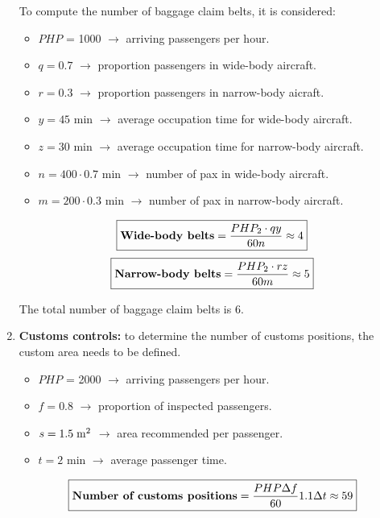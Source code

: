 \begin{enumerate}
To compute the number of baggage claim belts, it is considered:
\begin{itemize}
\item $PHP$ = 1000 $\rightarrow$ arriving passengers per hour.
\item $q=0.7$ $\rightarrow$ proportion passengers in wide-body aircraft.
\item $r=0.3$ $\rightarrow$ proportion passengers in narrow-body aicraft.
\item $y=45$ min $\rightarrow$ average occupation time for wide-body aircraft.
\item $z=30$ min $\rightarrow$ average occupation time for narrow-body aircraft.
\item $n=400 \cdot 0.7$ min $\rightarrow$ number of pax in wide-body aircraft.
\item $m=200\cdot 0.3$ min $\rightarrow$ number of pax in narrow-body aircraft.
\end{itemize}

\begin{align*}
\boxed{\text{\textbf{Wide-body belts}}= \dfrac{PHP_2\cdot qy}{60n}\approx 4}
\end{align*}
\begin{align*}
\boxed{\text{\textbf{Narrow-body belts}}= \dfrac{PHP_2\cdot rz}{60m}\approx 5}
\end{align*}

The total number of baggage claim belts is 6. 

\item \textbf{Customs controls:} to determine the number of customs positions, the custom area needs to be defined.
\begin{itemize}
\item $PHP$ = 2000 $\rightarrow$ arriving passengers per hour.
\item $f=0.8$ $\rightarrow$  proportion of inspected passengers.
\item $s=1.5\hspace{1mm} \mathrm{m^2}$ $\rightarrow$ area recommended per passenger.
\item $t=2$ min $\rightarrow$ average passenger time.
\end{itemize}

\begin{align*}
\boxed{\text{\textbf{Number of customs positions}} = \dfrac{PHP\Delta f}{60}1.1\Delta t \approx 59}
\end{align*}





\end{enumerate}